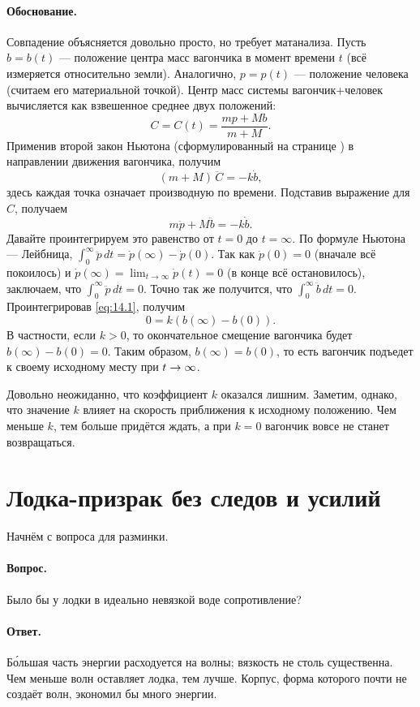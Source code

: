 \paragraph{Обоснование.}
Совпадение объясняется довольно просто, но требует матанализа.
Пусть $b=b(t)$ --- положение центра масс вагончика в момент времени $t$ (всё измеряется относительно земли).
Аналогично, $p=p(t)$ --- положение человека
(считаем его материальной точкой).
Центр масс системы вагончик+человек вычисляется как взвешенное среднее двух положений:
\[C=C(t)=\frac{mp+Mb}{m+M}.\]
Применив второй закон Ньютона (сформулированный на странице \pageref{Законы Ньютона}) в направлении движения вагончика, получим
\[(m+M)\,\ddot{C}=-k \dot{b},\]
здесь каждая точка означает производную по времени.
Подставив выражение для $C$, получаем
\begin{equation}
m\ddot{p}+M\ddot{b}=-k\dot{b}.
\label{eq:14.1}
\end{equation}
Давайте проинтегрируем это равенство от $t=0$ до $t=\infty$.
По формуле Ньютона --- Лейбница,
$\int_0^\infty\ddot{p}\,dt
=
\dot{p}(\infty)-\dot{p}(0)$.
Так как $\dot{p}(0)=0$ (вначале всё покоилось) и
$\dot{p}(\infty)
=
\lim_{t\to\infty}\dot{p}(t)
=
0$ (в конце всё остановилось),
заключаем, что
$\int_0^\infty \ddot{p}\,dt=0$.
Точно так же получится, что
$\int_0^\infty \ddot{b}\,dt=0$.
Проинтегрировав \eqref{eq:14.1}, получим
\[0= k(b(\infty)-b(0)).\]
В частности, если $k > 0$, то окончательное смещение вагончика будет $b(\infty)-b(0)=0$.
Таким образом, $b(\infty)=b(0)$, то есть вагончик подъедет к своему исходному месту при $t\z\to\infty$.

Довольно неожиданно, что коэффициент $k$ оказался лишним.
Заметим, однако, что значение $k$ влияет на скорость
приближения к исходному положению.
Чем меньше $k$, тем больше придётся ждать, а при $k=0$ вагончик вовсе не станет возвращаться.

\section{Лодка-призрак без следов и усилий}

Начнём с вопроса для разминки.

\paragraph{Вопрос.}
Было бы у лодки в идеально невязкой воде сопротивление?

\paragraph{Ответ.}
Б\'{о}льшая часть энергии расходуется на волны; вязкость не столь существенна.
Чем меньше волн оставляет лодка, тем лучше.
Корпус, форма которого почти не создаёт волн, экономил бы много энергии.

